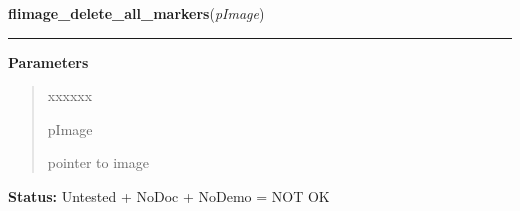     \label{xformslib:flflimage:flimage_delete_all_markers}

    \vspace{0.5ex}

\hspace{.8\funcindent}\begin{boxedminipage}{\funcwidth}

    \raggedright \textbf{flimage\_delete\_all\_markers}(\textit{pImage})

    \vspace{-1.5ex}

    \rule{\textwidth}{0.5\fboxrule}
\setlength{\parskip}{2ex}
\setlength{\parskip}{1ex}
      \textbf{Parameters}
      \vspace{-1ex}

      \begin{quote}
        \begin{Ventry}{xxxxxx}

          \item[pImage]

          pointer to image

        \end{Ventry}

      \end{quote}

\textbf{Status:} Untested + NoDoc + NoDemo = NOT OK



    \end{boxedminipage}

    \label{xformslib:flflimage:flimage_render_annotation}

    \vspace{0.5ex}

